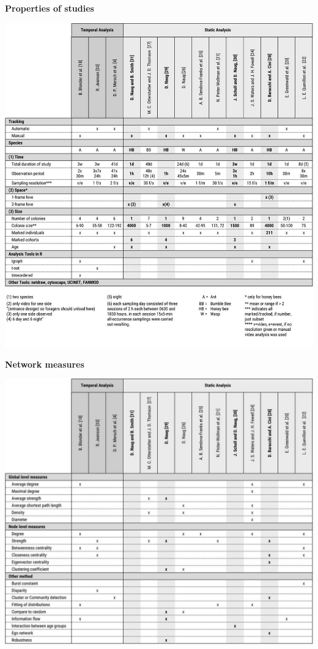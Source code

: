 \begin{table}
  	\centering
  	\caption[Properties of studies]{\textbf{Properties of studies}}
  	\label{tab:study-study}
  	\vspace{3mm}
  	\includegraphics[width=1.0\textwidth]{Figures/study-study}
\end{table}


\begin{table}
	\centering
	\caption[Network measures]{\textbf{Network measures}}
	\label{tab:study-measures}
	\vspace{3mm}
	\includegraphics[width=1.0\textwidth]{Figures/study-measures}
\end{table}



